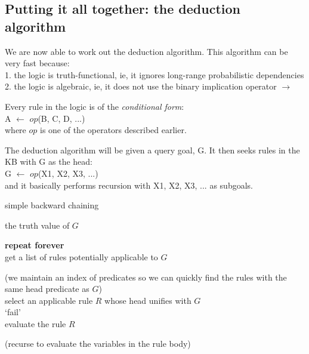\documentclass[a4paper]{report}
\newcommand{\algrepeatforever}{\textbf{repeat forever}\\\algbegin}
\begin{document}
\subsection{Putting it all together: the deduction algorithm}

We are now able to work out the deduction algorithm.  This algorithm can be very fast because:\\
1.  the logic is truth-functional, ie, it ignores long-range probabilistic dependencies\\
2.  the logic is algebraic, ie, it does not use the binary implication operator $\rightarrow$

Every rule in the logic is of the \textit{conditional form}:\\
\hspace*{1cm} A $\leftarrow$ $op$(B, C, D, ...)\\
where $op$ is one of the operators described earlier.

The deduction algorithm will be given a query goal, G.  It then seeks rules in the KB with G as the head:\\
\hspace*{1cm} G $\leftarrow$ $op$(X1, X2, X3, ...)\\
and it basically performs recursion with X1, X2, X3, ... as subgoals.

\begin{algorithm}[H]
\label{algorithm1}
\caption{simple backward chaining}
{the truth value of $G$}
\begin{algtab}
\algrepeatforever
get a list of rules potentially applicable to $G$\\
\addtocounter{algline}{-1}\algnonumber (we maintain an index of predicates so we can quickly find the rules with the same head predicate as $G$)\\
select an applicable rule $R$ whose head unifies with $G$\\
\algreturn `fail'\\
\algend
evaluate the rule $R$\\
\addtocounter{algline}{-1}\algnonumber (recurse to evaluate the variables in the rule body)\\
\end{algtab}
\end{algorithm}
\vspace{-0.6cm}
\end{document}
